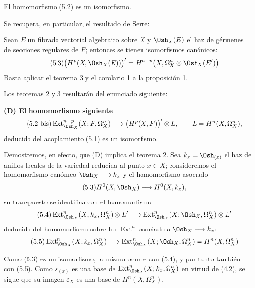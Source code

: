  El homomorfismo (5.2) es un isomorfismo.

Se recupera, en particular, el resultado de Serre:

 Sean $E$ un fibrado vectorial algebraico sobre $X$ y
$\Osh_X(E)$ el haz de gérmenes de secciones regulares de $E$; entonces se tienen
isomorfismos canónicos:
\begin{equation}\tag{5.3}
  \bigl(H^{p}(X,\Osh_X(E))\bigr)'
  =H^{n-p}\bigl(X,\Omega_X^{n}\otimes\Osh_X(E')\bigr)
\end{equation}
Basta aplicar el teorema 3 y el corolario 1 a la proposición 1.

Los teoremas 2 y 3 resultarán del enunciado siguiente:

\noindent\textbf{(D) El homomorfismo siguiente}
\begin{equation}\tag{5.2 bis}
  \operatorname{Ext}_{\Osh_X}^{n-p}(X;F,\Omega_X^{n})
  \longrightarrow\bigl(H^{p}(X,F)\bigr)'\otimes L,
  \qquad L=H^{n}(X,\Omega_X^{n}),
\end{equation}
deducido del acoplamiento (5.1) es un isomorfismo.

Demostremos, en efecto, que (D) implica el teorema 2. Sea
$k_x=\Osh_{(x)}$ el haz de anillos locales de la variedad reducida al punto
$x\in X$; consideremos el homomorfismo canónico
$\Osh_X\longrightarrow k_x$ y el homomorfismo asociado
\begin{equation}\tag{5.3}
  H^{0}(X,\Osh_X)\longrightarrow H^{0}(X,k_x),
\end{equation}
su transpuesto se identifica con el homomorfismo
\begin{equation}\tag{5.4}
  \operatorname{Ext}_{\Osh_X}^{n}(X;k_x,\Omega_X^{n})\otimes L'
  \longrightarrow
  \operatorname{Ext}_{\Osh_X}^{n}(X;\Osh_X,\Omega_X^{n})\otimes L'
\end{equation}
deducido del homomorfismo sobre los $\operatorname{Ext}^{n}$ asociado a
$\Osh_X\longrightarrow k_x$:
\begin{equation}\tag{5.5}
  \operatorname{Ext}_{\Osh_X}^{n}(X;k_x,\Omega_X^{n})
  \longrightarrow
  \operatorname{Ext}_{\Osh_X}^{n}(X;\Osh_X,\Omega_X^{n})
  =H^{n}(X,\Omega_X^{n})
\end{equation}

Como (5.3) es un isomorfismo, lo mismo ocurre
con (5.4), y por tanto también con (5.5). Como $s_{(x)}$ es una base de
$\operatorname{Ext}_{\Osh_X}^{n}(X;k_x,\Omega_X^{n})$ en virtud de (4.2), se
sigue que su imagen $\varepsilon_X$ es una base de
$H^{n}(X,\Omega_X^{n})$.

